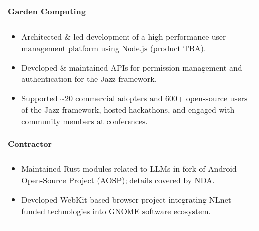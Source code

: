 \documentclass[letterpaper,10pt]{article} %
\begin{document}
\begin{tabular*}{\linewidth}{@{\extracolsep{\fill}} lr }

\textbf{Garden Computing} & \scriptsize\bfseries\color{sectioncolour}{San Francisco, CA}\\
\footnotesize\bfseries\color{sectioncolour}{Full-Stack Software Engineer} & \scriptsize\bfseries\color{sectioncolour}{February 2025 - Present}\\
\multicolumn{2}{p{\linewidth}}{
    \scriptsize{\vspace{-0.1in}\begin{itemize}[nosep]
        \item Architected \& led development of a high-performance user management platform using Node.js (product TBA).
        \item Developed \& maintained APIs for permission management and authentication for the Jazz framework.
        \item Supported \~{}20 commercial adopters and 600+ open-source users of the Jazz framework, hosted hackathons, and engaged with community members at conferences.
    \end{itemize}\vspace{-0.00in}}
}\\
\textbf{Contractor} & \scriptsize\bfseries\color{sectioncolour}{Remote}\\
\footnotesize\bfseries\color{sectioncolour}{Full-Stack Software Engineer} & \scriptsize\bfseries\color{sectioncolour}{August 2024 - February 2025}\\
\multicolumn{2}{p{\linewidth}}{
    \scriptsize{\vspace{-0.1in}\begin{itemize}[nosep]
        \item Maintained Rust modules related to LLMs in fork of Android Open-Source Project (AOSP); details covered by NDA\@.
        \item Developed WebKit-based browser project integrating NLnet-funded technologies into GNOME software ecosystem.
    \end{itemize}\vspace{-0.00in}}
}\\


\end{tabular*}
\end{document}
